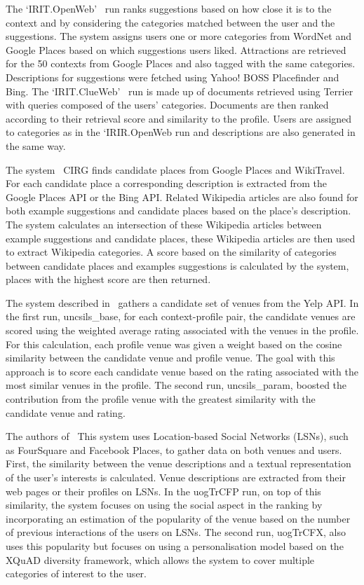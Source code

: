 \documentclass{llncs}
\begin{document}
The `IRIT.OpenWeb'~\cite{Hubert_2013} run ranks suggestions based on how close it is to the context and by considering the
categories matched between the user and the suggestions. The system assigns users one or more categories
from WordNet and Google Places based on which suggestions users liked. Attractions are retrieved for the
50 contexts from Google Places and also tagged with the same categories. Descriptions for suggestions were
fetched using Yahoo! BOSS Placefinder and Bing.
The `IRIT.ClueWeb'~\cite{Hubert_2013} run is made up of documents retrieved using Terrier with queries composed of the
users' categories. Documents are then ranked according to their retrieval score and similarity to the profile.
Users are assigned to categories as in the `IRIR.OpenWeb run and descriptions are also generated in the
same way.


The system~\cite{Bellogin_2013} CIRG finds candidate places from Google Places and WikiTravel. For each candidate place a corresponding description is extracted from the Google Places API or the Bing API. Related Wikipedia articles are also found for both example suggestions and candidate places based on the place's description. The system calculates an intersection of these Wikipedia articles between example suggestions and candidate places,
these Wikipedia articles are then used to extract Wikipedia categories. A score based on the similarity of
categories between candidate places and examples suggestions is calculated by the system, places with the
highest score are then returned.

The system described in~\cite{Avula_2013} gathers a candidate set of venues from the Yelp API. In the first run, uncsils\_base, for each context-profile pair, the candidate venues are scored using the weighted average rating associated with the venues in the profile. For this calculation, each profile venue was given a weight based on the cosine similarity between the candidate venue and profile venue. The goal with this approach is to score each candidate venue based on the rating associated with the most similar venues in the profile. The second run, uncsils\_param, boosted the contribution from the profile venue with the greatest similarity with the candidate venue and rating.

The authors of~\cite{McCreadie_2013} This system uses Location-based Social Networks (LSNs), such as FourSquare and Facebook Places, to gather data on both venues and users. First, the similarity between the venue descriptions and a textual
representation of the user's interests is calculated. Venue descriptions are extracted from their web pages or
their profiles on LSNs. In the uogTrCFP run, on top of this similarity, the system focuses on using the social
aspect in the ranking by incorporating an estimation of the popularity of the venue based on the number of
previous interactions of the users on LSNs. The second run, uogTrCFX, also uses this popularity but focuses
on using a personalisation model based on the XQuAD diversity framework, which allows the system to cover
multiple categories of interest to the user.
\end{document}
